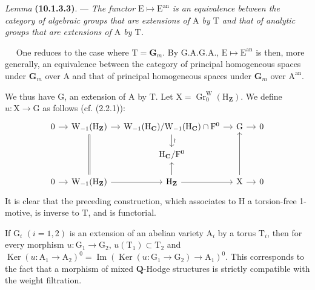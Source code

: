 \documentclass[11pt,leqno]{article}
\newcommand{\Page}[1]{\ifvmode\noindent\else\unskip\ \fi{\footnotesize\textcolor{gray}{[p.\,#1]}}\ \ignorespaces}
\begin{document}
\textit{Lemma} \textbf{(10.1.3.3)}. —
\textit{The functor \(\mathrm{E}\mapsto\mathrm{E}^{\mathrm{an}}\)
is an equivalence between the category of algebraic groups that are extensions
of \(\mathrm{A}\) by \(\mathrm{T}\) and that of analytic groups
that are extensions of \(\mathrm{A}\) by \(\mathrm{T}\).}

\Page{56}
One reduces to the case where \(\mathrm{T}=\mathbf{G}_m\).
By G.A.G.A., \(\mathrm{E}\mapsto\mathrm{E}^{\mathrm{an}}\) is
then, more generally, an equivalence between the category of principal homogeneous spaces
under \(\mathbf{G}_m\) over \(\mathrm{A}\) and that of principal homogeneous spaces under
\(\mathbf{G}_m\) over \(\mathrm{A}^{\mathrm{an}}\).

We thus have \(\mathrm{G}\), an extension of \(\mathrm{A}\) by
\(\mathrm{T}\). Let
\(\mathrm{X}=\operatorname{Gr}^{\mathrm{W}}_0(\mathrm{H}_{\mathbf{Z}})\).
We define \(u:\mathrm{X}\to\mathrm{G}\) as follows (cf. (2.2.1)):
\[
\begin{tikzcd}[column sep=1.1em, row sep=1.5em]
0 \arrow[r]
&
\mathrm{W}_{-1}(\mathrm{H}_{\mathbf{Z}}) \arrow[r]
&
\mathrm{W}_{-1}(\mathrm{H}_{\mathbf{C}})
/
\mathrm{W}_{-1}(\mathrm{H}_{\mathbf{C}})\cap\mathrm{F}^0
  \arrow[r] \arrow[d, "\wr"]
&
\mathrm{G} \arrow[r]
&
0
\\
& &
\mathrm{H}_{\mathbf{C}}/\mathrm{F}^0
& &
\\
0 \arrow[r]
&
\mathrm{W}_{-1}(\mathrm{H}_{\mathbf{Z}})
  \arrow[r] \arrow[uu, equal]
&
\mathrm{H}_{\mathbf{Z}} \arrow[r] \arrow[u]
&
\mathrm{X} \arrow[r] \arrow[uu]
&
0
\end{tikzcd}
\]
It is clear that the preceding construction, which associates to \(\mathrm{H}\)
a torsion-free 1-motive, is inverse to \(\mathrm{T}\), and is
functorial.

If \(\mathrm{G}_i\) \((i=1,2)\) is an extension of an abelian variety
\(\mathrm{A}_i\) by a torus \(\mathrm{T}_i\), then for every morphism
\(u:\mathrm{G}_1\to\mathrm{G}_2\),
\(u(\mathrm{T}_1)\subset\mathrm{T}_2\) and
\(\operatorname{Ker}(u:\mathrm{A}_1\to\mathrm{A}_2)^0
=\operatorname{Im}(\operatorname{Ker}(u:\mathrm{G}_1\to\mathrm{G}_2)
\to\mathrm{A}_1)^0\).
This corresponds to the fact that a morphism of mixed \(\mathbf{Q}\)-Hodge
structures is strictly compatible with the weight filtration.
\end{document}
